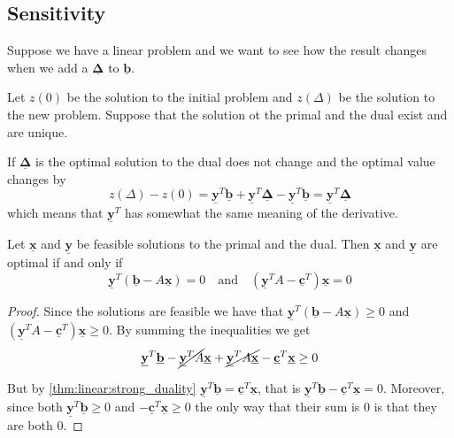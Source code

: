\documentclass[14pt]{extarticle}
\renewcommand{\vec}[1]{\underline{\mathbf{#1}}}
\begin{document}
\subsection{Sensitivity}

Suppose we have a linear problem and we want to see how the result changes when we add a $\vec \Delta$ to $\vec b$.

Let $z(0)$ be the solution to the initial problem and $z(\Delta)$ be the solution to the new problem.
Suppose that the solution ot the primal and the dual exist and are unique.

If $\vec \Delta$ is  the optimal solution to the dual does not change and the optimal value changes by
\begin{equation}
    z(\Delta) - z(0) = \vec y^T \vec b + \vec y^T \vec \Delta - \vec y^T \vec b = \vec y^T \vec \Delta
\end{equation}
which means that $\vec y^T$ has somewhat the same meaning of the derivative.

\begin{theorem}
    Let $\vec x$ and $\vec y$ be feasible solutions to the primal and the dual.
    Then $\vec x$ and $\vec y$ are optimal if and only if
    \begin{equation}
        \vec y^T (\vec b - A \vec x) = 0 \quad \text{and} \quad (\vec y^T A - \vec c^T) \vec x = 0
    \end{equation}
\end{theorem}

\begin{proof}
    Since the solutions are feasible we have that $\vec y^T (\vec b - A \vec x) \geq 0$ and $(\vec y^T A - \vec c^T) \vec x \geq 0$.
    By summing the inequalities we get
    \begin{equation}
        \vec y^T \vec b - \cancel{\vec y^T A} \vec x + \cancel{\vec y^T A \vec x} - \vec c^T \vec x \geq 0
    \end{equation}

    But by \autoref{thm:linear:strong_duality} $\vec y^T \vec b = \vec c^T \vec x$, that is $\vec y^T \vec b - \vec c^T \vec x = 0$.
    Moreover, since both $\vec y^T \vec b \geq 0$ and $-\vec c^T \vec x \geq 0$ the only way that their sum is $0$ is that they are both $0$.
\end{proof}
\end{document}
